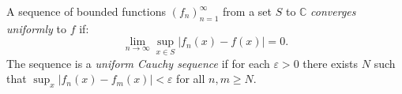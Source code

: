 A sequence of bounded functions $(f_n)_{n=1}^{\infty}$ from a set $S$ to $\mathbb{C}$ \textit{converges uniformly} to $f$ if:
\[
\lim_{n \to \infty} \sup_{x \in S} |f_n(x) - f(x)| = 0.
\]
The sequence is a \textit{uniform Cauchy sequence} if for each $\varepsilon > 0$ there exists $N$ such that $\sup_x |f_n(x) - f_m(x)| < \varepsilon$ for all $n, m \geq N$.
